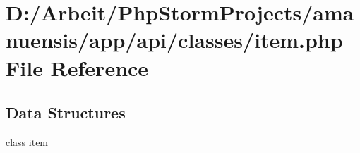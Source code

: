 \hypertarget{a00062}{}\section{D\+:/\+Arbeit/\+Php\+Storm\+Projects/amanuensis/app/api/classes/item.php File Reference}
\label{a00062}
\subsection*{Data Structures}
\begin{DoxyCompactItemize}
\item 
class \hyperlink{a00026}{item}
\end{DoxyCompactItemize}
